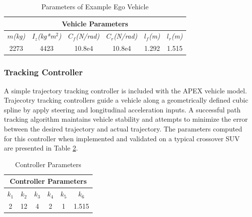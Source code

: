 \begin{table}[h]
	\centering
	\caption{Parameters of Example Ego Vehicle \cite{Althoff2014}}
	\label{table:vehiclep}
	\begin{tabular}{|c|c|c|c|c|c|}
		\hline
		\multicolumn{6}{|c|}{Vehicle Parameters} \\ \hline
		\textit{$m$(kg)} & \textit{$I_z$(kg*m$^2$)} & \textit{$C_f$(N/rad)} & \textit{$C_r$(N/rad)} & \textit{$l_f$(m)} & \textit{$l_r$(m)} \\ \hline
		2273 & 4423 & 10.8e4 & 10.8e4 & 1.292 & 1.515 \\ \hline
	\end{tabular}	
\end{table}

\subsubsection{Tracking Controller}
A simple trajectory tracking controller is included with the APEX vehicle model. Trajecotry tracking controllers guide a vehicle along a geometrically defined cubic spline by apply steering and longitudinal acceleration inputs. A successful path tracking algorithm maintains vehicle stability and attempts to minimize the error between the desired trajectory and actual trajectory. The parameters computed for this controller when implemented and validated on a typical crossover SUV \cite{Althoff2014} are presented in Table \ref{table:controller}. 

\begin{table}[h]
	\centering
	\caption{Controller Parameters \cite{Althoff2014}}
	\label{table:controller}
	\begin{tabular}{|c|c|c|c|c|c|}
		\hline
		\multicolumn{6}{|c|}{Controller Parameters} \\ \hline
		$k_1$ & $k_2$ & $k_3$ & $k_4$ & $k_5$ & $k_6$ \\ \hline
		2 & 12 & 4 & 2 & 1 & 1.515 \\ \hline
	\end{tabular}	
\end{table}




